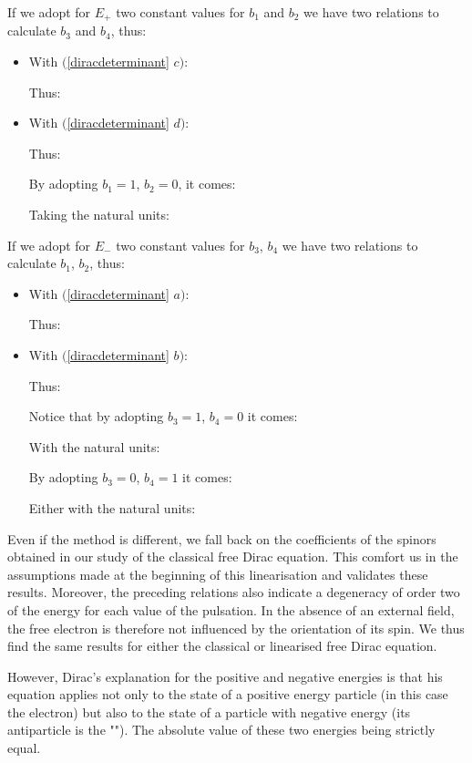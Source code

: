 	If we adopt for $E_{+}$ two constant values for $b_1$ and $b_2$ we have two relations to calculate $b_3$ and $b_4$, thus:
	\begin{itemize}
		\item With $($\ref{diracdeterminant} $c)$:
		
		Thus:
		
		
		\item With $($\ref{diracdeterminant} $d)$:
		
		Thus:
		
		By adopting $b_1=1$, $b_2=0$, it comes:
		
		Taking the natural units:
		
	\end{itemize}
	If we adopt for $E_{-}$ two constant values for $b_3$, $b_4$ we have two relations to calculate $b_1$, $b_2$, thus:
	\begin{itemize}
		\item With $($\ref{diracdeterminant} $a)$:
		
		Thus:
		
	
		\item With $($\ref{diracdeterminant} $b)$:
		
		Thus:
		
		Notice that by adopting $b_3=1$, $b_4=0$ it comes:
		
		With the natural units:
		
		By adopting $b_3=0$, $b_4=1$ it comes:
		
		Either with the natural units:
		
	\end{itemize}
	Even if the method is different, we fall back on the coefficients of the spinors obtained in our study of the classical free Dirac equation. This comfort us in the assumptions made at the beginning of this linearisation and validates these results. Moreover, the preceding relations also indicate a degeneracy of order two of the energy for each value of the pulsation. In the absence of an external field, the free electron is therefore not influenced by the orientation of its spin. We thus find the same results for either the classical or linearised free Dirac equation.

	However, Dirac's explanation for the positive and negative energies is that his equation applies not only to the state of a positive energy particle (in this case the electron) but also to the state of a particle with negative energy (its antiparticle is the ""). The absolute value of these two energies being strictly equal.

